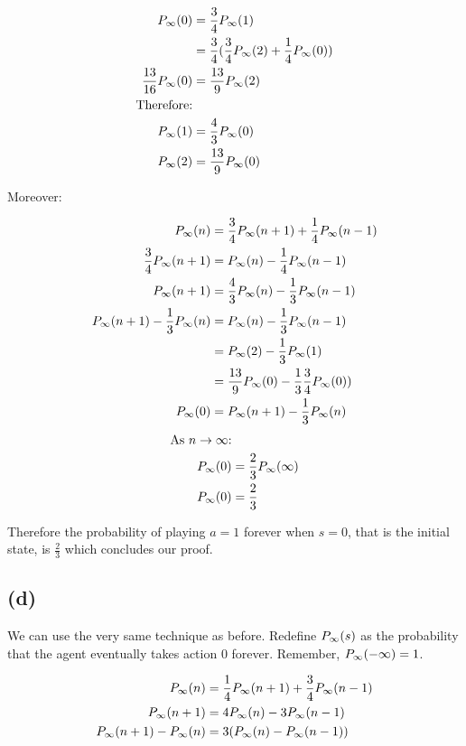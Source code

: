 \documentclass{article}
\begin{document}
\[
\begin{split}
  P_{\infty}(0)            & = \frac{3}{4}P_{\infty}(1) \\
                    & = \frac{3}{4}(\frac{3}{4}P_{\infty}(2) + \frac{1}{4}P_{\infty}(0)) \\
  \frac{13}{16}P_{\infty}(0)& = \frac{13}{9}P_{\infty}(2) \\
  \text{Therefore:} & \\
  P_{\infty}(1)            & = \frac{4}{3}P_{\infty}(0)\\
  P_{\infty}(2)            & = \frac{13}{9}P_{\infty}(0)\\
\end{split}
\]

Moreover:

\[
\begin{split}
  P_{\infty}(n)            & = \frac{3}{4}P_{\infty}(n + 1) + \frac{1}{4}P_{\infty}(n - 1) \\
  \frac{3}{4}P_{\infty}(n+1)& = P_{\infty}(n) - \frac{1}{4}P_{\infty}(n-1) \\
  P_{\infty}(n+1)          & = \frac{4}{3}P_{\infty}(n) - \frac{1}{3}P_{\infty}(n - 1) \\
  P_{\infty}(n+1) - \frac{1}{3}P_{\infty}(n) & = P_{\infty}(n) - \frac{1}{3}P_{\infty}(n - 1) \\
                    & = P_{\infty}(2) - \frac{1}{3}P_{\infty}(1) \\
                    & = \frac{13}{9}P_{\infty}(0) - \frac{1}{3}\frac{3}{4}P_{\infty}(0)) \\
  P_{\infty}(0)            & = P_{\infty}(n+1) - \frac{1}{3}P_{\infty}(n) \\
\end{split}
\]
\[
\begin{split}
  \text{As $n \to \infty$:} & \\
  P_{\infty}(0)            & = \frac{2}{3}P_{\infty}(\infty) \\
  P_{\infty}(0)            & = \frac{2}{3}
\end{split}
\]

Therefore the probability of playing $a = 1$ forever when $s = 0$, that is
the initial state, is $ \frac{2}{3}$ which concludes our proof.

\subsection{(d)} %

We can use the very same technique as before. Redefine $P_{\infty}(s)$ as the probability
that the agent eventually takes action $0$ forever. Remember, $P_{\infty}(-\infty) = 1$.

\[
\begin{split}
  P_{\infty}(n)            & = \frac{1}{4}P_{\infty}(n + 1) + \frac{3}{4}P_{\infty}(n - 1) \\
  P_{\infty}(n + 1)        & = 4P_{\infty}(n) - 3P_{\infty}(n-1) \\
  P_{\infty}(n + 1) - P_{\infty}(n)& = 3(P_{\infty}(n) - P_{\infty}(n-1)) 
\end{split}
\]
\end{document}
